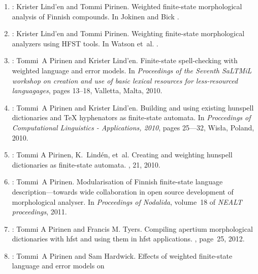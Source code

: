 \documentclass[officiallayout]{unihelcompling}
\begin{document}
\begin{enumerate}
    \item \citep{pirinen2009weighted}:
        Krister Lind{'e}n and Tommi Pirinen.
        \newblock Weighted finite-state morphological analysis of Finnish 
        compounds.
        \newblock In Jokinen and Bick \citep{conf/nodalida/2009}.
    \item \citep{pirinen2009weighting}:
        Krister Lind{'e}n and Tommi Pirinen.
        \newblock Weighting finite-state morphological analyzers using HFST
        tools.
        \newblock In Watson et~al. \citep{conf/fsmnlp/2009}.
    \item \citep{pirinen2010finitestate}:
        Tommi~A Pirinen and Krister Lind'{e}n.
        \newblock Finite-state spell-checking with weighted language and error
        models.
        \newblock In {\em Proceedings of the Seventh SaLTMiL workshop on 
            creation and use of basic lexical resources for less-resourced 
        languagages}, pages 13--18, Valletta, Malta, 2010.
    \item \citep{pirinen2010building}:
        Tommi~A Pirinen and Krister Lind'{e}n.
        \newblock Building and using existing hunspell dictionaries and {\TeX }
        hyphenators as finite-state automata.
        \newblock In {\em Proccedings of Computational Linguistics -
            Applications, 2010}, pages 25---32, Wis{\l}a, Poland, 2010.
    \item \citep{pirinen2010creating}:
        Tommi A Pirinen, K.~Lind{\'e}n, et~al.
        \newblock Creating and weighting hunspell dictionaries as finite-state
        automata.
        , 21, 2010.
    \item \citep{pirinen2011modularisation}:
        Tommi~A Pirinen.
        \newblock Modularisation of Finnish finite-state language 
        description—towards wide collaboration in open source development of
        morphological analyser.
        \newblock In {\em Proceedings of Nodalida}, volume~18 of {\em NEALT
        proceedings}, 2011.
    \item \citep{pirinen2012compiling}: 
        Tommi A Pirinen and Francis M. Tyers.
        \newblock Compiling apertium morphological dictionaries with hfst and
        using them in hfst applications.
        , page~25, 2012.
    \item \citep{pirinen2012effects}: Tommi~A Pirinen and Sam Hardwick.
        \newblock Effects of weighted finite-state language and error models on

\end{enumerate}
\end{document}
